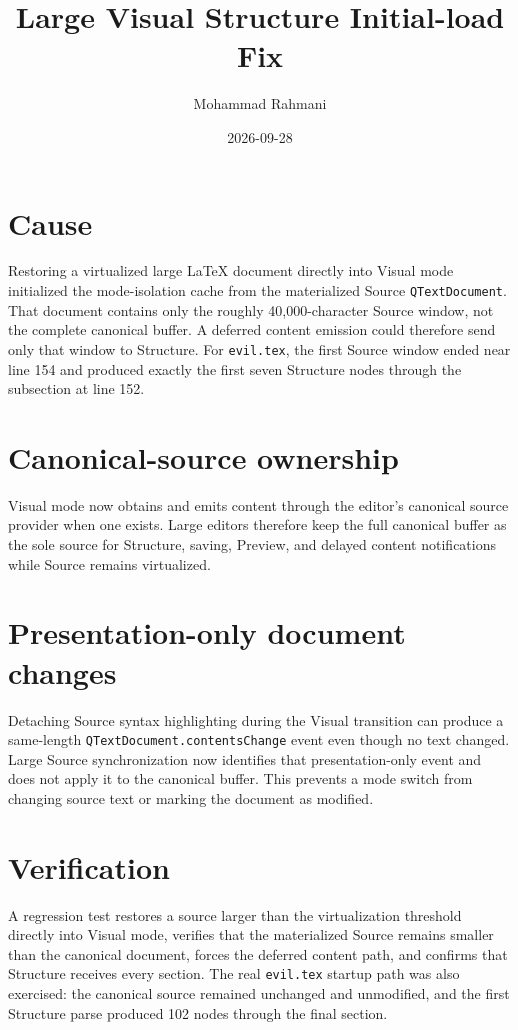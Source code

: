 \documentclass[a4paper]{article}
\title{Large Visual Structure Initial-load Fix}
\date{2026-09-28}
\author{Mohammad Rahmani}
\begin{document}
   \maketitle

   \begin{preview}
      \section{Cause}
      Restoring a virtualized large LaTeX document directly into Visual mode
      initialized the mode-isolation cache from the materialized Source
      \texttt{QTextDocument}. That document contains only the roughly
      40,000-character Source window, not the complete canonical buffer.
      A deferred content emission could therefore send only that window to
      Structure. For \texttt{evil.tex}, the first Source window ended near
      line 154 and produced exactly the first seven Structure nodes through
      the subsection at line 152.

      \section{Canonical-source ownership}
      Visual mode now obtains and emits content through the editor's canonical
      source provider when one exists. Large editors therefore keep the full
      canonical buffer as the sole source for Structure, saving, Preview, and
      delayed content notifications while Source remains virtualized.

      \section{Presentation-only document changes}
      Detaching Source syntax highlighting during the Visual transition can
      produce a same-length \texttt{QTextDocument.contentsChange} event even
      though no text changed. Large Source synchronization now identifies that
      presentation-only event and does not apply it to the canonical buffer.
      This prevents a mode switch from changing source text or marking the
      document as modified.

      \section{Verification}
      A regression test restores a source larger than the virtualization
      threshold directly into Visual mode, verifies that the materialized
      Source remains smaller than the canonical document, forces the deferred
      content path, and confirms that Structure receives every section.
      The real \texttt{evil.tex} startup path was also exercised: the
      canonical source remained unchanged and unmodified, and the first
      Structure parse produced 102 nodes through the final section.
   \end{preview}

   
   
\end{document}
